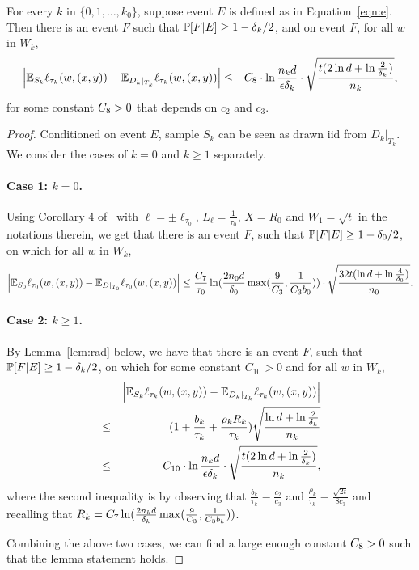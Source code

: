 \begin{lemma}
For every $k$ in $\{0,1,\ldots,k_0\}$, suppose event $E$ is defined as in Equation~\eqref{eqn:e}. Then there is an event $F$ such that
$\P[F|E] \geq 1-\delta_k/2$, and on event $F$, for all $w$ in $W_k$,
\begin{eqnarray*}
\left| \E_{S_k} \ell_{\tau_k}(w, (x, y)) - \E_{D_k |_{T_k}} \ell_{\tau_k}(w, (x, y)) \right|
&\leq& \cfo  \cdot \ln\frac{n_k d}{\epsilon \delta_k} \cdot \sqrt{\frac{t(2\ln d + \ln \frac 2 {\delta_k})}{n_k}},
\end{eqnarray*}
\label{lem:sktk}
for some constant $\cfo > 0$ that depends on $c_2$ and $c_3$.
\end{lemma}

\begin{proof}
	Conditioned on event $E$, sample $S_k$ can be seen as drawn iid from $D_k|_{T_k}$.
	We consider the cases of $k = 0$ and $k \geq 1$ separately.
	\paragraph{Case 1: $k = 0$.} Using Corollary 4 of~\cite{KST09} with $\ell = \pm \ell_{\tau_0}$, $L_\ell = \frac{1}{\tau_0}$, $X = R_0$ and $W_1 = \sqrt{t}$ in the notations therein, we
	get that there is an event $F$, such that $\P[F|E] \geq 1-\delta_0/2$, on which for all $w$ in $W_k$,
	\begin{equation}
	\left| \E_{S_0} \ell_{\tau_0}(w, (x, y)) - \E_{D |_{T_0}} \ell_{\tau_0}(w, (x, y)) \right| \leq \frac{\cse}{\tau_0} \ln(\frac{2n_0 d}{\delta_0} \max(\frac9{\cf}, \frac{1}{\cf b_0})) \cdot \sqrt{\frac{32 t(\ln d + \ln \frac 4 {\delta_0})}{n_0}}.  \nonumber
	\end{equation}

	\paragraph{Case 2: $k \geq 1$.} By Lemma~\ref{lem:rad} below, we have that there is an event $F$, such that $\P[F|E] \geq 1-\delta_k/2$, on which for some constant $C_{10} > 0$ and for all $w$ in $W_k$,
	\begin{eqnarray}
	&& \left| \E_{S_k} \ell_{\tau_k}(w, (x, y)) - \E_{D_k |_{T_k}} \ell_{\tau_k}(w, (x, y)) \right| \nonumber \\
	&\leq& (1 + \frac{b_k}{\tau_k} + \frac{\rho_k R_k}{\tau_k}) \sqrt{\frac{\ln d + \ln \frac 2 {\delta_k}}{n_k}} \nonumber \\
	&\leq& C_{10} \cdot \ln\frac{n_k d}{\epsilon \delta_k} \cdot \sqrt{\frac{t(2\ln d + \ln \frac 2 {\delta_k})}{n_k}}, \nonumber
	\end{eqnarray}
	where the second inequality is by observing that $\frac{b_k}{\tau_k} = \frac{c_2}{c_3}$ and $\frac{\rho_k}{\tau_k} = \frac{\sqrt{2t}}{8c_3}$ and recalling that $R_k = \cse \ln(\frac{2n_k d}{\delta_k} \max(\frac9{\cf }, \frac{1}{\cf b_k}))$.

	Combining the above two cases, we can find a large enough constant $\cfo >0$ such that the lemma statement holds.
\end{proof}

